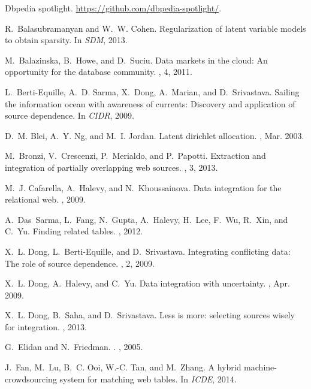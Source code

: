 \documentclass{sig-alternate}
\begin{document}
\begin{thebibliography}{10}

Dbpedia spotlight.
\newblock \url{https://github.com/dbpedia-spotlight/}.

R.~Balasubramanyan and W.~W. Cohen.
\newblock Regularization of latent variable models to obtain sparsity.
\newblock In {\em SDM}, 2013.

M.~Balazinska, B.~Howe, and D.~Suciu.
\newblock Data markets in the cloud: An opportunity for the database community.
, 4, 2011.

L.~Berti-Equille, A.~D. Sarma, X.~Dong, A.~Marian, and D.~Srivastava.
\newblock Sailing the information ocean with awareness of currents: Discovery
  and application of source dependence.
\newblock In {\em CIDR}, 2009.

D.~M. Blei, A.~Y. Ng, and M.~I. Jordan.
\newblock Latent dirichlet allocation.
, Mar. 2003.

M.~Bronzi, V.~Crescenzi, P.~Merialdo, and P.~Papotti.
\newblock Extraction and integration of partially overlapping web sources.
, 3, 2013.

M.~J. Cafarella, A.~Halevy, and N.~Khoussainova.
\newblock Data integration for the relational web.
, 2009.

A.~Das~Sarma, L.~Fang, N.~Gupta, A.~Halevy, H.~Lee, F.~Wu, R.~Xin, and C.~Yu.
\newblock Finding related tables.
, 2012.

X.~L. Dong, L.~Berti-Equille, and D.~Srivastava.
\newblock Integrating conflicting data: The role of source dependence.
, 2, 2009.

X.~L. Dong, A.~Halevy, and C.~Yu.
\newblock Data integration with uncertainty.
, Apr. 2009.

X.~L. Dong, B.~Saha, and D.~Srivastava.
\newblock Less is more: selecting sources wisely for integration.
, 2013.

G.~Elidan and N.~Friedman.
.
, 2005.

J.~Fan, M.~Lu, B.~C. Ooi, W.-C. Tan, and M.~Zhang.
\newblock A hybrid machine-crowdsourcing system for matching web tables.
\newblock In {\em ICDE}, 2014.


\end{thebibliography}
\end{document}
